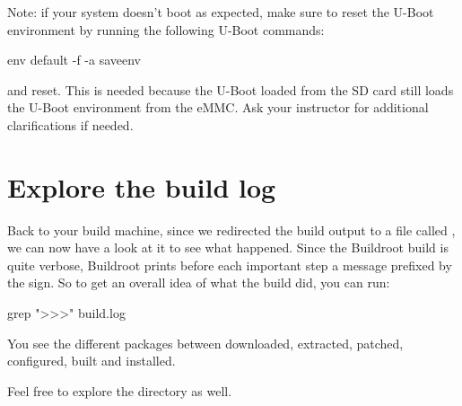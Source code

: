 Note: if your system doesn't boot as expected, make sure to reset the
U-Boot environment by running the following U-Boot commands:

\begin{bashinput}
env default -f -a
saveenv
\end{bashinput}

and reset. This is needed because the U-Boot loaded from the SD card
still loads the U-Boot environment from the eMMC. Ask your instructor
for additional clarifications if needed.

\section{Explore the build log}

Back to your build machine, since we redirected the build output to a
file called , we can now have a look at it to see what
happened. Since the Buildroot build is quite verbose, Buildroot prints
before each important step a message prefixed by the \code{>>>}
sign. So to get an overall idea of what the build did, you can run:

\begin{bashinput}
grep ">>>" build.log
\end{bashinput}

You see the different packages between downloaded, extracted, patched,
configured, built and installed.

Feel free to explore the  directory as well.
